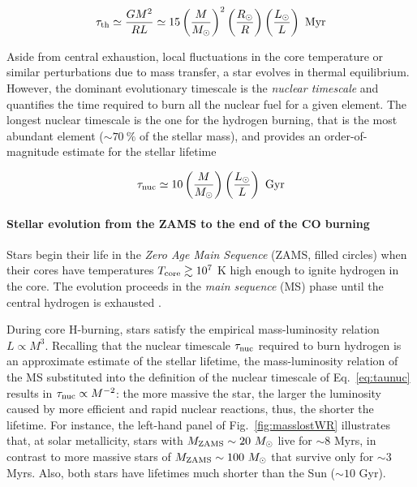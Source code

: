 \documentclass[a4paper,titlepage]{book}     	%
\newcommand{\sun}{\ensuremath{_\odot}}
\newcommand{\mzams}{M_\textup{ZAMS}}
\newcommand{\msun}{\ensuremath{M\sun}}
\begin{document}
\begin{equation}\label{eq:tauth}
\tau_\textup{th} \simeq \frac{G M^2}{R L} \simeq 15 
\left(\frac{M}{M\sun}\right)^{2} \left(\frac{R\sun}{R}\right) \left(\frac{L\sun}{L}\right)\ \text{Myr}
\end{equation}

Aside from central exhaustion, local fluctuations in the core temperature or similar perturbations due to mass transfer, a star evolves in thermal equilibrium. However, the dominant evolutionary timescale is the \emph{nuclear timescale} and quantifies the time required to burn all the nuclear fuel for a given element. The longest nuclear timescale is the one for the hydrogen burning, that is the most abundant element ($\sim 70~\%$ of the stellar mass), and provides an order-of-magnitude estimate for the stellar lifetime

\begin{equation}\label{eq:taunuc}
\tau_\textup{nuc} \simeq 10 \left(\frac{M}{M\sun}\right) \left(\frac{L\sun}{L}\right)\ \text{Gyr}
\end{equation}

\paragraph{Stellar evolution from the ZAMS to the end of the CO burning} Stars begin their life in the \emph{Zero Age Main Sequence} (ZAMS, filled circles) when their cores have temperatures $T_{\rm core} \gtrsim 10^{7}$ K high enough to ignite hydrogen in the core. The evolution proceeds in the \emph{main sequence} (MS) phase until the central hydrogen is exhausted \cite{evostellare}. 

During core H-burning, stars satisfy the empirical mass-luminosity relation $L \propto M^3$. Recalling that the nuclear timescale $\tau_{\rm nuc}$ required to burn hydrogen is an approximate estimate of the stellar lifetime, the mass-luminosity relation of the MS substituted into the definition of the nuclear timescale of Eq.\ \ref{eq:taunuc} results in $\tau_{\rm nuc} \propto M^{-2}$: the more massive the star, the larger the luminosity caused by more efficient and rapid nuclear reactions, thus, the shorter the lifetime. For instance, the left-hand panel of Fig.\ \ref{fig:masslostWR} illustrates that, at solar metallicity, stars with $\mzams \sim 20~\msun$ live for $\sim 8$ Myrs, in contrast to more massive stars of $\mzams \sim 100~\msun$ that survive only for $\sim 3$ Myrs. Also, both stars have lifetimes much shorter than the Sun ($\sim{10}$ Gyr).
\end{document}
